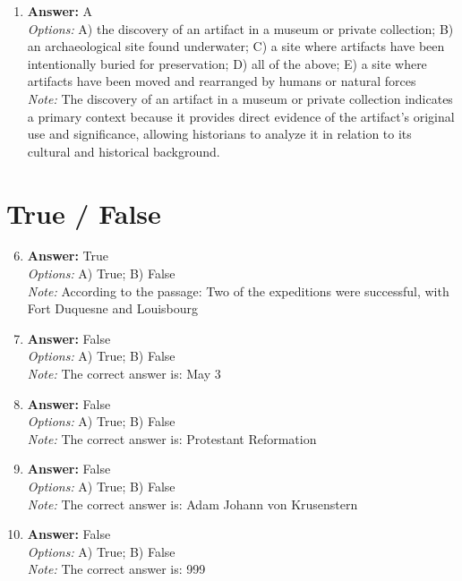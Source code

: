 \documentclass[12pt]{article}
\begin{document}
\begin{enumerate}[label=\arabic*.]
\\ \textit{Note:} The correct answer is based on the understanding that during the Pleistocene era, the landmasses of Java, Sumatra, Bali, and Borneo were part of a larger continental shelf known as Sundaland, while the land connecting Australia, New Guinea, and Tasmania was referred to as Sahul, highlighting the geographical and geological distinctions of these regions during that period.
\item \textbf{Answer:} A
\\ \textit{Options:} A) the discovery of an artifact in a museum or private collection; B) an archaeological site found underwater; C) a site where artifacts have been intentionally buried for preservation; D) all of the above; E) a site where artifacts have been moved and rearranged by humans or natural forces
\\ \textit{Note:} The discovery of an artifact in a museum or private collection indicates a primary context because it provides direct evidence of the artifact's original use and significance, allowing historians to analyze it in relation to its cultural and historical background.
\end{enumerate}

\section*{True / False}
\begin{enumerate}[label=\arabic*.]
\setcounter{enumi}{5}
\item \textbf{Answer:} True
\\ \textit{Options:} A) True; B) False
\\ \textit{Note:} According to the passage: Two of the expeditions were successful, with Fort Duquesne and Louisbourg
\item \textbf{Answer:} False
\\ \textit{Options:} A) True; B) False
\\ \textit{Note:} The correct answer is: May 3
\item \textbf{Answer:} False
\\ \textit{Options:} A) True; B) False
\\ \textit{Note:} The correct answer is: Protestant Reformation
\item \textbf{Answer:} False
\\ \textit{Options:} A) True; B) False
\\ \textit{Note:} The correct answer is: Adam Johann von Krusenstern
\item \textbf{Answer:} False
\\ \textit{Options:} A) True; B) False
\\ \textit{Note:} The correct answer is: 999
\end{enumerate}
\end{document}

